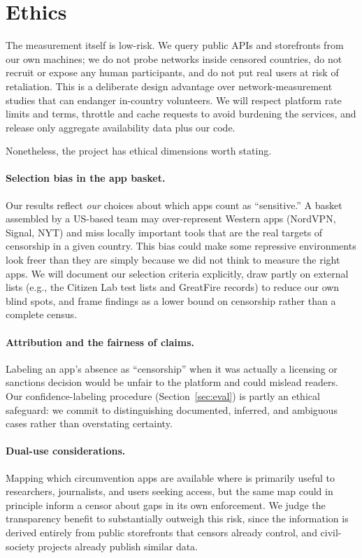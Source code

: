 \section{Ethics}\label{sec:ethics}

The measurement itself is low-risk. We query public APIs and storefronts from our
own machines; we do not probe networks inside censored countries, do not recruit
or expose any human participants, and do not put real users at risk of
retaliation. This is a deliberate design advantage over network-measurement
studies that can endanger in-country volunteers. We will respect platform rate
limits and terms, throttle and cache requests to avoid burdening the services, and
release only aggregate availability data plus our code.

Nonetheless, the project has ethical dimensions worth stating.

\paragraph{Selection bias in the app basket.} Our results reflect \emph{our}
choices about which apps count as ``sensitive.'' A basket assembled by a
US-based team may over-represent Western apps (NordVPN, Signal, NYT) and miss
locally important tools that are the real targets of censorship in a given
country. This bias could make some repressive environments look freer than they
are simply because we did not think to measure the right apps. We will document
our selection criteria explicitly, draw partly on external lists (e.g., the
Citizen Lab test lists and GreatFire records) to reduce our own blind spots, and
frame findings as a lower bound on censorship rather than a complete census.

\paragraph{Attribution and the fairness of claims.} Labeling an app's absence as
``censorship'' when it was actually a licensing or sanctions decision would be
unfair to the platform and could mislead readers. Our confidence-labeling
procedure (Section~\ref{sec:eval}) is partly an ethical safeguard: we commit to
distinguishing documented, inferred, and ambiguous cases rather than overstating
certainty.

\paragraph{Dual-use considerations.} Mapping which circumvention apps are
available where is primarily useful to researchers, journalists, and users seeking
access, but the same map could in principle inform a censor about gaps in its own
enforcement. We judge the transparency benefit to substantially outweigh this
risk, since the information is derived entirely from public storefronts that
censors already control, and civil-society projects already publish similar data.
